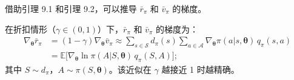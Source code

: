 \documentclass[UTF8]{article}
\begin{document}
借助引理 9.1 和引理 9.2，可以推导 $\bar{r}_\pi$ 和 $\bar{v}_\pi$ 的梯度。

\begin{theorembox}
    在折扣情形（$\gamma \in (0,1)$）下，$\bar{r}_\pi$ 和 $\bar{v}_\pi$ 的梯度为：
    \begin{align*}
    \nabla_{\boldsymbol{\theta}} \bar{r}_\pi &= (1 - \gamma) \nabla_{\boldsymbol{\theta}} \bar{v}_\pi
    \approx \sum_{s \in \mathcal{S}} d_\pi(s) \sum_{a \in \mathcal{A}} \nabla_{\boldsymbol{\theta}} \pi(a|s, \boldsymbol{\theta}) \, q_\pi(s,a) \\
    &= \mathbb{E}\bigl[ \nabla_{\boldsymbol{\theta}} \ln \pi(A|S, \boldsymbol{\theta}) \, q_\pi(S, A) \bigr];
    \end{align*}
    其中 $S \sim d_\pi$，$A \sim \pi(S, \boldsymbol{\theta})$。该近似在 $\gamma$ 越接近 1 时越精确。
\end{theorembox}
\end{document}
